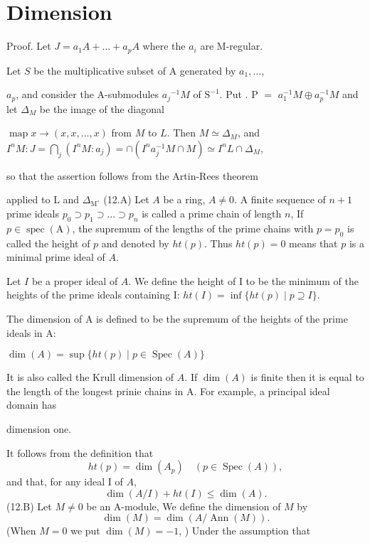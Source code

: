 \section{Dimension}
Proof. Let $J=a_{1} A+\ldots+a_{p} A$ where the $a_{i}$ are M-regular.

Let $S$ be the multiplicative subset of A generated by $a_{1}, \ldots$,

$a_{p}$, and consider the A-submodules $a_{j}{ }^{-1} M$ of $\mathrm{S}^{-1}$. Put . P $=$ $a_{1}^{-1} M \oplus a_{p}^{-1} M$ and let $\Delta_{M}$ be the image of the diagonal

$\operatorname{map} x \rightarrow(x, x, \ldots, x)$ from $M$ to $L$. Then $M \simeq \Delta_{M}$, and $I^{n} M: J=\bigcap_{j}\left(I^{n} M: a_{j}\right)=\cap\left(I^{n} a_{j}^{-1} M \cap M\right) \simeq I^{n} L \cap \Delta_{M}$,

so that the assertion follows from the Artin-Rees theorem

applied to $\mathrm{L}$ and $\Delta_{\mathrm{M}^{\circ}}$ (12.A) Let $A$ be a ring, $A \neq 0$. A finite sequence of $n+1$ prime ideals $p_{0} \supset p_{1} \supset \ldots \supset p_{n}$ is called a prime chain of length $n$, If $p \in \operatorname{spec}(\mathrm{A})$, the supremum of the lengths of the prime chains with $p=p_{0}$ is called the height of $p$ and denoted by $h t(p)$. Thus $h t(p)=0$ means that $p$ is a minimal prime ideal of $A$.

Let $I$ be a proper ideal of $A$. We define the height of I to be the minimum of the heights of the prime ideals containing I: $h t(I)=\inf \{h t(p) \mid p \supseteq I\}$.

The dimension of A is defined to be the supremum of the heights of the prime ideals in A:

$\operatorname{dim}(A)=\sup \{h t(p) \mid p \in \operatorname{Spec}(A)\}$

It is also called the Krull dimension of $A$. If $\operatorname{dim}(A)$ is finite then it is equal to the length of the longest prinie chains in A. For example, a principal ideal domain has

dimension one.

It follows from the definition that
$$
h t(p)=\operatorname{dim}\left(A_{p}\right) \quad(p \in \operatorname{Spec}(A)),
$$
and that, for any ideal I of $A$,
$$
\operatorname{dim}(A / I)+h t(I) \leqslant \operatorname{dim}(A) .
$$
(12.B) Let $M \neq 0$ be an A-module, We define the dimension of $M$ by
$$
\operatorname{dim}(M)=\operatorname{dim}(A / \operatorname{Ann}(M)) .
$$
(When $M=0$ we put $\operatorname{dim}(M)=-1$, ) Under the assumption that

